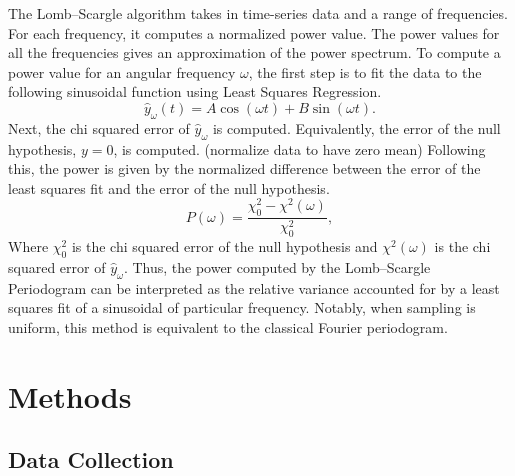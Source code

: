 \documentclass[preprint]{aastex701}
\begin{document}
The Lomb--Scargle algorithm takes in time-series data and a range of frequencies. For each frequency, it computes a normalized power value. The power values for all the frequencies gives an approximation of the power spectrum.\citep{scargle1982} To compute a power value for an angular frequency $\omega$, the first step is to fit the data to the following sinusoidal function using Least Squares Regression.
\begin{equation}
\hat{y}_\omega(t) = A \cos(\omega t) + B \sin(\omega t).
\end{equation}
Next, the chi squared error of $\hat{y}_\omega$ is computed. Equivalently, the error of the null hypothesis, $y=0$, is computed. (normalize data to have zero mean) Following this, the power is given by the normalized difference between the error of the least squares fit and the error of the null hypothesis.
\begin{equation}
P(\omega)
=
\frac{\chi^2_0 - \chi^2(\omega)}{\chi^2_0},
\end{equation}
Where $\chi^2_0$ is the chi squared error of the null hypothesis and $\chi^2(\omega)$ is the chi squared error of $\hat{y}_\omega$. Thus, the power computed by the Lomb--Scargle Periodogram can be interpreted as the relative variance accounted for by a least squares fit of a sinusoidal of particular frequency. Notably, when sampling is uniform, this method is equivalent to the classical Fourier periodogram. \citep{scargle1982}

\section{Methods}

\subsection{Data Collection}
\end{document}

